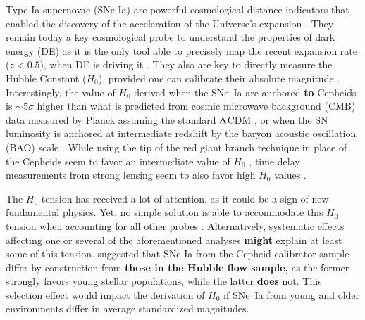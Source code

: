 \documentclass[referee]{aa}
\begin{document}
Type Ia supernovae (SNe Ia) are powerful cosmological distance indicators that
enabled the discovery of the acceleration of the Universe's expansion
\citep{riess1998, perlmutter1999}. They remain today a key cosmological probe to
understand the properties of dark energy (DE) as it is the only tool able to
precisely map the recent expansion rate ($z<0.5$), when DE is driving it
\citep[e.g.][]{scolnicastro2020}. They also are key to directly measure the
Hubble Constant ($H_0$), provided one can calibrate their absolute magnitude
\citep{riess2016, freedman2019}. Interestingly, the value of $H_0$ derived when
the SNe~Ia are anchored \textbf{to} Cepheids \citep[the SH0ES
project,][]{riess2009, riess2016} is $\sim5\sigma$ higher than what is predicted
from cosmic microwave background (CMB) data measured by Planck assuming the
standard $\Lambda$CDM \citep{planck2018, riess2019, reid2019}, or when the SN
luminosity is anchored at intermediate redshift by the baryon acoustic
oscillation (BAO) scale \citep{feeney2019}. While using the tip of the red giant
branch technique in place of the Cepheids seem to favor an intermediate value of
$H_0$ \citep{freedman2019, freedman2020}, time delay measurements from strong
lensing seem to also favor high $H_0$ values \citep{wong2019}.

The $H_0$ tension has received a lot of attention, as it could be a sign of new
fundamental physics. Yet, no simple solution is able to accommodate this $H_0$
tension when accounting for all other probes \citep{knox2019}. Alternatively,
systematic effects affecting one or several of the aforementioned analyses
\textbf{might} explain at least some of this tension. \cite{rigault2015}
suggested that SNe Ia from the Cepheid calibrator sample differ by construction
from \textbf{those in the Hubble flow sample,} as the former strongly favors
young stellar populations, while the latter \textbf{does} not. This selection
effect would impact the derivation of $H_0$ if SNe~Ia from young and older
environments differ in average standardized magnitudes. 
\end{document}
